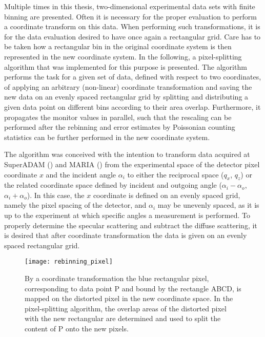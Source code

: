 \documentclass[\main/dresen_thesis.tex]{subfiles}
\begin{document}
  Multiple times in this thesis, two-dimensional experimental data sets with finite binning are presented.
  Often it is necessary for the proper evaluation to perform a coordinate transform on this data.
  When performing such transformations, it is for the data evaluation desired to have once again a rectangular grid.
  Care has to be taken how a rectangular bin in the original coordinate system is then represented in the new coordinate system.
  In the following, a pixel-splitting algorithm that was implemented for this purpose is presented.
  The algorithm performs the task for a given set of data, defined with respect to two coordinates, of applying an arbitrary (non-linear) coordinate transformation and saving the new data on an evenly spaced rectangular grid by splitting and distributing a given data point on different bins according to their area overlap.
  Furthermore, it propagates the monitor values in parallel, such that the rescaling can be performed after the rebinning and error estimates by Poissonian counting statistics can be further performed in the new coordinate system.

  The algorithm was conceived with the intention to transform data acquired at SuperADAM ()  and MARIA () from the experimental space of the detector pixel coordinate $x$ and the incident angle $\alpha_i$ to either the reciprocal space ($q_x$, $q_z$) or the related coordinate space defined by incident and outgoing angle ($\alpha_i - \alpha_o$, $\alpha_i + \alpha_o$).
  In this case, the $x$ coordinate is defined on an evenly spaced grid, namely the pixel spacing of the detector, and $\alpha_i$ may be unevenly spaced, as it is up to the experiment at which specific angles a measurement is performed.
  To properly determine the specular scattering and subtract the diffuse scattering, it is desired that after coordinate transformation the data is given on an evenly spaced rectangular grid.

  \begin{figure}[tb]
    \centering
    \texttt{[image: rebinning\_pixel]}
    \caption{\label{fig:numericalMethods:rebinningPixelSplitting:pixelTransform}By a coordinate transformation the blue rectangular pixel, corresponding to data point P and bound by the rectangle ABCD, is mapped on the distorted pixel in the new coordinate space. In the pixel-splitting algorithm, the overlap areas of the distorted pixel with the new rectangular are determined and used to split the content of P onto the new pixels.}
  \end{figure}
\end{document}
